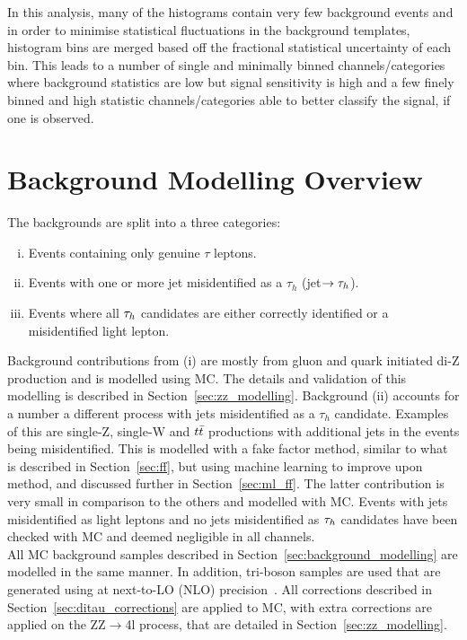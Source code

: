 In this analysis, many of the histograms contain very few background events and in order to minimise statistical fluctuations in the background templates, histogram bins are merged based off the fractional statistical uncertainty of each bin.
This leads to a number of single and minimally binned channels/categories where background statistics are low but signal sensitivity is high and a few finely binned and high statistic channels/categories able to better classify the signal, if one is observed.
 
\section{Background Modelling Overview}

The backgrounds are split into a three categories:
\begin{enumerate}[i)]
  \item Events containing only genuine $\tau$ leptons.
  \item Events with one or more jet misidentified as a $\tau_h$ (jet$\rightarrow \tau_{h}$).
  \item Events where all $\tau_{h}$ candidates are either correctly identified or a misidentified light lepton. 
\end{enumerate}

Background contributions from (i) are mostly from gluon and quark initiated di-Z production and is modelled using MC.
The details and validation of this modelling is described in Section~\ref{sec:zz_modelling}.
Background (ii) accounts for a number a different process with jets misidentified as a $\tau_h$ candidate.
Examples of this are single-Z, single-W and $t\bar{t}$ productions with additional jets in the events being misidentified.
This is modelled with a fake factor method, similar to what is described in Section~\ref{sec:ff}, but using machine learning to improve upon method, and discussed further in Section~\ref{sec:ml_ff}.
The latter contribution is very small in comparison to the others and modelled with MC.
Events with jets misidentified as light leptons and no jets misidentified as $\tau_{h}$ candidates have been checked with MC and deemed negligible in all channels. \\

All MC background samples described in Section~\ref{sec:background_modelling} are modelled in the same manner.  
In addition, tri-boson samples are used that are generated using \MGvATNLO at next-to-LO (NLO) precision~\cite{Alwall:2011uj}.
All corrections described in Section~\ref{sec:ditau_corrections} are applied to MC, with extra corrections are applied on the ZZ$\rightarrow$4l process, that are detailed in Section~\ref{sec:zz_modelling}.

